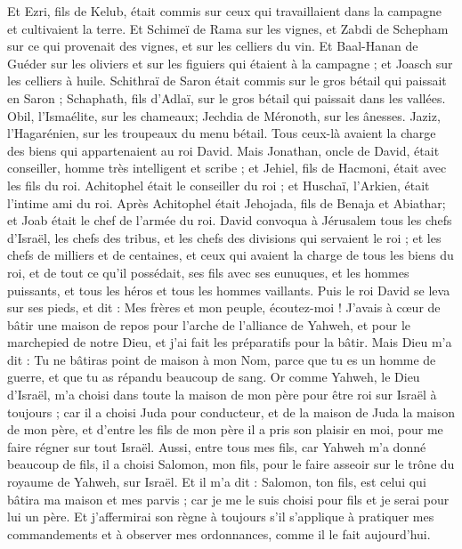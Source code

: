\begin{multicols}{2}
Et Ezri, fils de Kelub, était commis sur ceux qui travaillaient dans la campagne et cultivaient la terre.
Et Schimeï de Rama sur les vignes, et Zabdi de Schepham sur ce qui provenait des vignes, et sur les celliers du vin.
Et Baal-Hanan de Guéder sur les oliviers et sur les figuiers qui étaient à la campagne ; et Joasch sur les celliers à huile.
Schithraï de Saron était commis sur le gros bétail qui paissait en Saron ; Schaphath, fils d'Adlaï, sur le gros bétail qui paissait dans les vallées.
Obil, l'Ismaélite, sur les chameaux; Jechdia de Méronoth, sur les ânesses.
Jaziz, l'Hagarénien, sur les troupeaux du menu bétail. Tous ceux-là avaient la charge des biens qui appartenaient au roi David.
Mais Jonathan, oncle de David, était conseiller, homme très intelligent et scribe ; et Jehiel, fils de Hacmoni, était avec les fils du roi.
Achitophel était le conseiller du roi ; et Huschaï, l'Arkien, était l'intime ami du roi.
Après Achitophel était Jehojada, fils de Benaja et Abiathar; et Joab était le chef de l'armée du roi.
\VerseOne{}David convoqua à Jérusalem tous les chefs d'Israël, les chefs des tribus, et les chefs des divisions qui servaient le roi ; et les chefs de milliers et de centaines, et ceux qui avaient la charge de tous les biens du roi, et de tout ce qu’il possédait, ses fils avec ses eunuques, et les hommes puissants, et tous les  héros et tous les hommes vaillants.
Puis le roi David se leva sur ses pieds, et dit : Mes frères et mon peuple, écoutez-moi ! J’avais à cœur de bâtir une maison de repos pour l’arche de l'alliance de Yahweh, et pour le marchepied de notre Dieu, et j'ai fait les préparatifs pour la bâtir.
Mais Dieu m'a dit : Tu ne bâtiras point de maison à mon Nom, parce que tu es un homme de guerre, et que tu as répandu beaucoup de sang.
Or comme Yahweh, le Dieu d'Israël, m'a choisi dans toute la maison de mon père pour être roi sur Israël à toujours ; car il a choisi Juda pour conducteur, et de la maison de Juda la maison de mon père, et d'entre les fils de mon père il a pris son plaisir en moi, pour me faire régner sur tout Israël.
Aussi, entre tous mes fils, car Yahweh m'a donné beaucoup de fils, il a choisi Salomon, mon fils, pour le faire asseoir sur le trône du royaume de Yahweh, sur Israël.
Et il m'a dit : Salomon, ton fils, est celui qui bâtira ma maison et mes parvis ; car je me le suis choisi pour fils et je serai pour lui un père.
Et j'affermirai son règne à toujours s'il s'applique à pratiquer mes commandements et à observer mes ordonnances, comme il le fait aujourd'hui.

\end{multicols}
